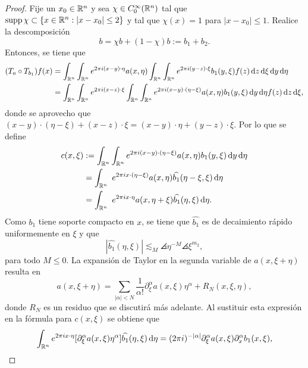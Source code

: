 \begin{proof}
	Fije un $x_0\in\mathbb{R}^n$ y sea $\chi\in C^\infty_0(\mathbb{R}^n)$ tal que $\operatorname{supp} \chi\subset\{x\in\mathbb{R}^n:|x-x_0|\leq 2\}$ y tal que $\chi(x) = 1$ para $|x-x_0|\leq 1$. Realice la descomposición 
	\begin{equation*}
		b = \chi b + (1-\chi)b := b_1 + b_2.
	\end{equation*}
	Entonces, se tiene que 
	\begin{align*}
		(T_a\circ T_{b_1})f(x) &= \int_{\R^n}\int_{\R^n} e^{2\pi i (x-y)\cdot\eta} a(x, \eta)
		\int_{\R^n}\int_{\R^n} e^{2\pi i(y-z)\cdot\xi}b_1(y, \xi)f(z)\diff z \diff \xi \diff y \diff \eta\\
		& = \int_{\R^n}\int_{\R^n}  e^{2\pi i (x-z)\cdot\xi} \int_{\R^n}\int_{\R^n} 
		e^{2\pi i(x-y)\cdot(\eta-\xi)} a(x, \eta)b_1(y, \xi)\diff y \diff \eta f(z) \diff z \diff \xi,
	\end{align*}
	donde se aprovecho que $(x-y)\cdot(\eta-\xi) + (x-z)\cdot \xi= (x-y)\cdot\eta + (y-z)\cdot\xi$. Por lo que se define 
	\begin{align*}
		c(x, \xi) & :=  \int_{\mathbb{R}^n}\int_{\mathbb{R}^n} 
		e^{2\pi i(x-y)\cdot(\eta-\xi)} a(x, \eta)b_1(y, \xi)\mathop{}\!\mathrm{d} y \mathop{}\!\mathrm{d} \eta \\ 
		&=  \int_{\mathbb{R}^n}\
		e^{2\pi ix\cdot(\eta-\xi)} a(x, \eta)\widehat{b_1}(\eta-\xi, \xi) \mathop{}\!\mathrm{d} \eta \\
		&=  \int_{\mathbb{R}^n}\
		e^{2\pi ix\cdot\eta} a(x, \eta+\xi)\widehat{b_1}(\eta, \xi) \mathop{}\!\mathrm{d} \eta.
	\end{align*}
	Como $b_1$ tiene soporte compacto en $x$, se tiene que $\widehat{b_1}$ es de decaimiento rápido uniformemente en $\xi$ y que 
	\begin{equation*}
		|\widehat{b_1}(\eta,\xi)| \lesssim_M \angles{\eta}^{-M}\angles{\xi}^{m_2},
	\end{equation*}
	para todo $M\leq0$. La expansión de Taylor en la segunda variable de $a(x,\xi+\eta)$ resulta en 
	\begin{equation*}
		a(x, \xi + \eta) = \sum_{|\alpha|<N} \frac{1}{\alpha!} \partial^\alpha_\xi a(x, \xi)\eta^\alpha + R_N(x, \xi, \eta),
	\end{equation*}
	donde $R_N$ es un residuo que se discutirá más adelante. Al sustituir esta expresión en la fórmula para $c(x, \xi)$ se obtiene que 
	\begin{equation*}
		\int_{\mathbb{R}^n} e^{2\pi i x\cdot\eta}[\partial^\alpha_\xi a(x, \xi)\eta^\alpha]\widehat{b_1}(\eta, \xi) \mathop{}\!\mathrm{d} \eta = (2\pi i)^{-|\alpha|} 
		\partial^\alpha_\xi a(x, \xi) \partial^\alpha_x b_1(x, \xi),
	\end{equation*}

\end{proof}
